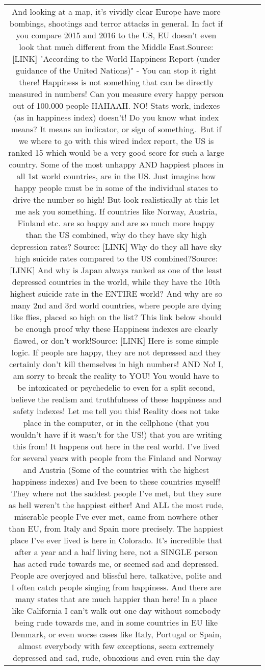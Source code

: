 \documentclass[11pt]{article}
\newlength\mylength
\begin{document}
\begin{center}
\begin{longtable}{|C{.65\mylength}|C{.30\mylength}|C{.12\mylength}|C{.12\mylength}|C{.12\mylength}|}
And looking at a map, it's vividly clear Europe have more bombings, shootings and terror attacks in general. In fact if you compare 2015 and 2016 to the US, EU doesn't even look that much different from the Middle East.Source:  [LINK] "According to the World Happiness Report (under guidance of the United Nations)" - You can stop it right there! Happiness is not something that can be directly measured in numbers! Can you measure every happy person out of 100.000 people HAHAAH. NO! Stats work, indexes (as in happiness index) doesn't! Do you know what index means? It means an indicator, or sign of something. But if we where to go with this wired index report, the US is ranked 15 which would be a very good score for such a large country. Some of the most unhappy AND happiest places in all 1st world countries, are in the US. Just imagine how happy people must be in some of the individual states to drive the number so high! But look realistically at this let me ask you something. If countries like Norway, Austria, Finland etc. are so happy and are so much more happy than the US combined, why do they have sky high depression rates? Source:  [LINK] Why do they all have sky high suicide rates compared to the US combined?Source:  [LINK] And why is Japan always ranked as one of the least depressed countries in the world, while they have the 10th highest suicide rate in the ENTIRE world?  And why are so many 2nd and 3rd world countries, where people are dying like flies, placed so high on the list? This link below should be enough proof why these Happiness indexes are clearly flawed, or don't work!Source:  [LINK] Here is some simple logic. If people are happy, they are not depressed and they certainly don't kill themselves in high numbers! AND No! I, am sorry to break the reality to YOU! You would have to be intoxicated or psychedelic to even for a split second, believe the realism and truthfulness of these happiness and safety indexes! Let me tell you this! Reality does not take place in the computer, or in the cellphone (that you wouldn't have if it wasn't for the US!) that you are writing this from! It happens out here in the real world. I've lived for several years with people from the Finland and Norway and Austria (Some of the countries with the highest happiness indexes) and Ive been to these countries myself! They where not the saddest people I've met, but they sure as hell weren't the happiest either! And ALL the most rude, miserable people I've ever met, came from nowhere other than EU, from Italy and Spain more precisely. The happiest place I've ever lived is here in Colorado. It's incredible that after a year and a half living here, not a SINGLE person has acted rude towards me, or seemed sad and depressed. People are overjoyed and blissful here, talkative, polite and I often catch people singing from happiness. And there are many states that are much happier than here! In a place like California I can't walk out one day without somebody being rude towards me, and in some countries in EU like Denmark, or even worse cases like Italy, Portugal or Spain, almost everybody with few exceptions, seem extremely depressed and sad, rude, obnoxious and even ruin the day 
\end{longtable}
\end{center}
\end{document}
